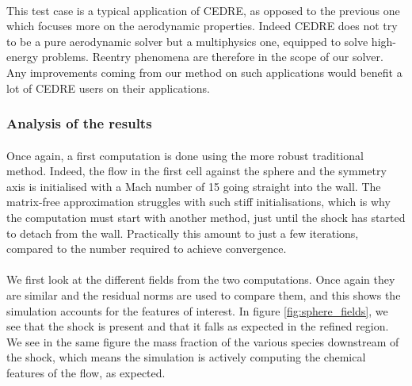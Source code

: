         \paragraph{}
        This test case is a typical application of CEDRE, as opposed to the previous one which focuses more on the aerodynamic properties.
        Indeed CEDRE does not try to be a pure aerodynamic solver but a multiphysics one, equipped to solve high-energy problems.
        Reentry phenomena are therefore in the scope of our solver.
        Any improvements coming from our method on such applications would benefit a lot of CEDRE users on their applications.


      \subsubsection{Analysis of the results}

        \paragraph{}
        Once again, a first computation is done using the more robust traditional method.
        Indeed, the flow in the first cell against the sphere and the symmetry axis is initialised with a Mach number of 15 going straight into the wall.
        The matrix-free approximation struggles with such stiff initialisations, which is why the computation must start with another method, just until the shock has started to detach from the wall.
        Practically this amount to just a few iterations, compared to the number required to achieve convergence.

        \paragraph{}
        We first look at the different fields from the two computations.
        Once again they are similar and the residual norms are used to compare them, and this shows the simulation accounts for the features of interest.
        In figure \ref{fig:sphere_fields}, we see that the shock is present and that it falls as expected in the refined region.
        We see in the same figure the mass fraction of the various species downstream of the shock, which means the simulation is actively computing the chemical features of the flow, as expected.

